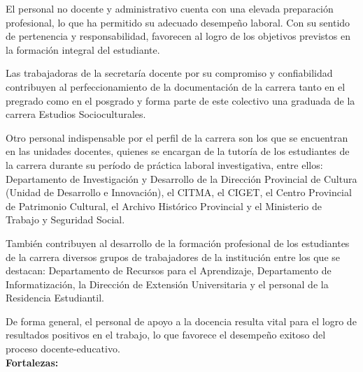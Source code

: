 El personal no docente y administrativo cuenta con una elevada preparación profesional, lo que ha permitido su adecuado desempeño laboral. Con su sentido de pertenencia y responsabilidad, favorecen al logro de los objetivos previstos en la formación integral del estudiante. 

Las trabajadoras de la secretaría docente por su compromiso y confiabilidad contribuyen al perfeccionamiento de la documentación de la carrera tanto en el pregrado como en el posgrado y forma parte de este colectivo una graduada de la carrera Estudios Socioculturales.

Otro personal indispensable por el perfil de la carrera son los que se encuentran en las unidades docentes, quienes se encargan de la tutoría de los estudiantes de la carrera durante su período de práctica laboral investigativa, entre ellos: Departamento de Investigación y Desarrollo de la Dirección Provincial de Cultura (Unidad de Desarrollo e Innovación), el CITMA, el CIGET, el Centro Provincial de Patrimonio Cultural, el Archivo Histórico Provincial y el Ministerio de Trabajo y Seguridad Social.

También contribuyen al desarrollo de la formación profesional de los estudiantes de la carrera diversos grupos de trabajadores de la institución entre los que se destacan: Departamento de Recursos para el Aprendizaje, Departamento de Informatización, la Dirección de Extensión Universitaria y el personal de la Residencia Estudiantil.

De forma general, el personal de apoyo a la docencia resulta vital para el logro de resultados positivos en el trabajo, lo que favorece el desempeño exitoso del proceso docente-educativo.\\

\textbf{Fortalezas:}

